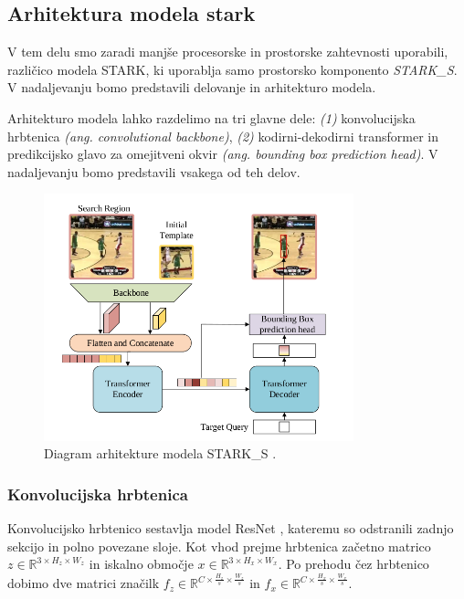 \documentclass[a4paper,12pt,openright]{book}
\begin{document}
\subsection{Arhitektura modela stark}
V tem delu smo zaradi manjše procesorske in prostorske zahtevnosti uporabili, različico modela STARK, ki uporablja samo prostorsko komponento \emph{STARK\_S}. V nadaljevanju bomo predstavili delovanje in arhitekturo modela.

Arhitekturo modela lahko razdelimo na tri glavne dele: \emph{(1)} konvolucijska hrbtenica \emph{(ang. convolutional backbone)}, \emph{(2)} kodirni-dekodirni transformer in predikcijsko glavo za omejitveni okvir \emph{(ang. bounding box prediction head)}. V nadaljevanju bomo predstavili vsakega od teh delov.


\begin{figure}[htb]
    \begin{center}
        \includegraphics[width=0.8\textwidth]{img/stark.png}
    \end{center}
    \caption{Diagram arhitekture modela STARK\_S \cite{attention_is_all_you_need}.}
    \label{img:stark}
\end{figure}

\subsubsection{Konvolucijska hrbtenica}
Konvolucijsko hrbtenico sestavlja model ResNet \cite{resnet}, kateremu so odstranili zadnjo sekcijo in polno povezane sloje. Kot vhod prejme hrbtenica začetno matrico $ z \in \mathbb{R}^{3 \times H_z \times W_z} $ in iskalno območje $ x \in \mathbb{R}^{3 \times H_x \times W_x} $. Po prehodu čez hrbtenico dobimo dve matrici značilk
$ f_z \in \mathbb{R}^{C \times \frac{H_z}{s} \times \frac{W_z}{s}} $ in $ f_x \in \mathbb{R}^{C \times \frac{H_x}{s} \times \frac{W_x}{s}} $.
\end{document}
